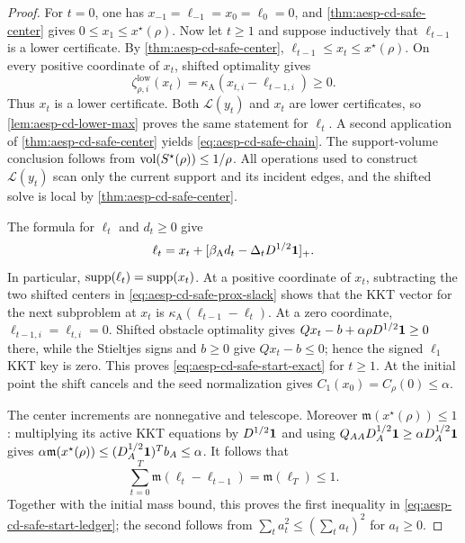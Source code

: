 \begin{proof}
For $t=0$, one has $x_{-1}=\ell_{-1}=x_0=\ell_0=0$, and
\cref{thm:aesp-cd-safe-center} gives $0\leq x_1\leq x^\star(\rho)$.
Now let $t\geq1$ and suppose inductively that $\ell_{t-1}$ is a lower
certificate.  By
\cref{thm:aesp-cd-safe-center},
$\ell_{t-1}\leq x_t\leq x^\star(\rho)$.  On every positive coordinate of
$x_t$, shifted optimality gives
\begin{equation}
 \zeta_{\rho,i}^{\mathrm{low}}(x_t)
 =\kappa_{\mathrm A}(x_{t,i}-\ell_{t-1,i})\geq0.
 \label{eq:aesp-cd-safe-prox-slack}
\end{equation}
Thus $x_t$ is a lower certificate.  Both $\mathcal L(y_t)$ and $x_t$ are
lower certificates, so \cref{lem:aesp-cd-lower-max} proves the same statement
for $\ell_t$.  A second application of
\cref{thm:aesp-cd-safe-center} yields \cref{eq:aesp-cd-safe-chain}.
The support-volume conclusion follows from
$\operatorname{vol}(S^\star(\rho))\leq1/\rho$.  All operations used to construct
$\mathcal L(y_t)$ scan only the current support and its incident edges, and
the shifted solve is local by \cref{thm:aesp-cd-safe-center}.

The formula for $\ell_t$ and $d_t\geq0$ give
\begin{equation*}
 \ell_t=x_t+
 [\beta_{\mathrm A}d_t-\Delta_tD^{1/2}\mathbf{1}]_+.
\end{equation*}
In particular, $\operatorname{supp}(\ell_t)=\operatorname{supp}(x_t)$.  At a positive coordinate of
$x_t$, subtracting the two shifted centers in
\cref{eq:aesp-cd-safe-prox-slack} shows that the KKT vector for the next
subproblem at $x_t$ is
$\kappa_{\mathrm A}(\ell_{t-1}-\ell_t)$.  At a zero coordinate,
$\ell_{t-1,i}=\ell_{t,i}=0$.  Shifted obstacle optimality gives
$Qx_t-b+\alpha\rho D^{1/2}\mathbf{1}\geq0$ there, while the Stieltjes signs and
$b\geq0$ give $Qx_t-b\leq0$; hence the signed $\ell_1$ KKT key is zero.
This proves \cref{eq:aesp-cd-safe-start-exact} for $t\geq1$.  At the initial
point the shift cancels and the seed normalization gives
$C_1(x_0)=C_\rho(0)\leq\alpha$.

The center increments are nonnegative and telescope.  Moreover
$\mathfrak m(x^\star(\rho))\leq1$: multiplying its active KKT equations by
$D^{1/2}\mathbf{1}$ and using
$Q_{AA}D_A^{1/2}\mathbf{1}\geq\alpha D_A^{1/2}\mathbf{1}$ gives
$\alpha\mathfrak m(x^\star(\rho))
\leq(D_A^{1/2}\mathbf{1})^Tb_A\leq\alpha$.
It follows that
\begin{equation*}
 \sum_{t=0}^T \mathfrak m(\ell_t-\ell_{t-1})
 =\mathfrak m(\ell_T)\leq1.
\end{equation*}
Together with the initial mass bound, this proves the first inequality in
\cref{eq:aesp-cd-safe-start-ledger}; the second follows from
$\sum_t a_t^2\leq(\sum_t a_t)^2$ for $a_t\geq0$.


\end{proof}

